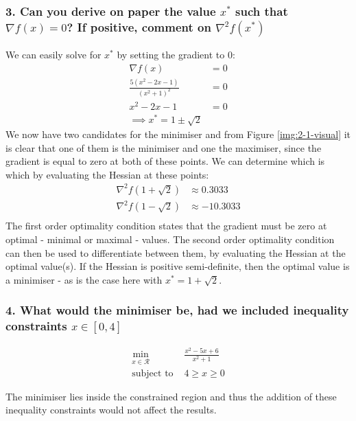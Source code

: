 \documentclass[letterpaper,12pt]{article}
\begin{document}
\subsubsection*{3. Can you derive on paper the value $x^*$ such that $\nabla f(x) = 0$? If positive, comment on $\nabla^2 f(x^*)$}
We can easily solve for $x^*$ by setting the gradient to 0:
\begin{equation}
\begin{aligned}
	\nabla f(x) &= 0 \\
	\frac{5(x^2 - 2x - 1)}{(x^2 + 1)^2} &= 0 \\
	x^2 - 2x - 1 &= 0 \\
	\implies x^* = 1 \pm \sqrt{2}
\end{aligned}
\end{equation}
We now have two candidates for the minimiser and from Figure \ref{img:2-1-visual} it is clear that one of them is the minimiser and one the maximiser, since the gradient is equal to zero at both of these points. We can determine which is which by evaluating the Hessian at these points:
\begin{equation}
\begin{aligned}
	\nabla^2 f(1 + \sqrt{2}) &\approx 0.3033\\
	\nabla^2 f(1 - \sqrt{2}) &\approx -10.3033\\
\end{aligned}
\end{equation}
The first order optimality condition states that the gradient must be zero at optimal - minimal or maximal - values. The second order optimality condition can then be used to differentiate between them, by evaluating the Hessian at the optimal value(s). If the Hessian is positive semi-definite, then the optimal value is a minimiser - as is the case here with $x^* = 1 + \sqrt{2}$.

\subsubsection*{4. What would the minimiser be, had we included inequality constraints $x\in[0,4]$}
\begin{equation}
\begin{aligned}
	\min_{x\in\mathcal{R}} &\frac{x^2 - 5x + 6}{x^2 + 1} \\
	\text{subject to }& 4\geq x \geq 0
\end{aligned}
\end{equation}

The minimiser lies inside the constrained region and thus the addition of these inequality constraints would not affect the results.
\end{document}

